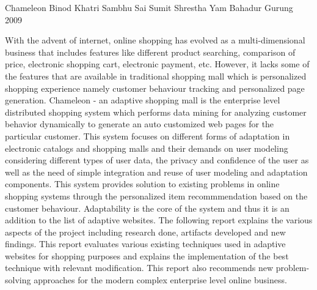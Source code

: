 \begin{conf-abstract}[]
{Chameleon}
{
               Binod Khatri
                Sambhu Sai
              Sumit Shrestha
             Yam Bahadur Gurung
}
{2009}

With the advent of internet, online shopping has evolved as a multi-dimensional business
that includes features like different product searching, comparison of price, electronic
shopping cart, electronic payment, etc. However, it lacks some of the features that are 
available in traditional shopping mall which is personalized shopping experience namely 
customer behaviour tracking and personalized page generation. Chameleon - an adaptive shopping
mall is the enterprise level distributed shopping system which performs data mining for analyzing customer 
behavior dynamically to generate an auto customized web pages for the particular customer. This system focuses
on different forms of adaptation in electronic catalogs and shopping malls and their demands on user modeling
considering different types of user data, the privacy and confidence of the user as well as the need of
simple integration and reuse of user modeling and adaptation components. This system provides solution 
to existing problems in online shopping systems through the personalized item recommmendation based on
the customer behaviour. Adaptability is the core of the system and thus it is an addition to the list of adaptive 
websites. The following report explains the various aspects of the project including research done, artifacts developed and 
new findings. This report evaluates various existing techniques used in adaptive websites for shopping
purposes and explains the implementation of the best technique with relevant modification. This report also recommends
new problem-solving approaches for the modern complex enterprise level online business.
\end{conf-abstract}

   